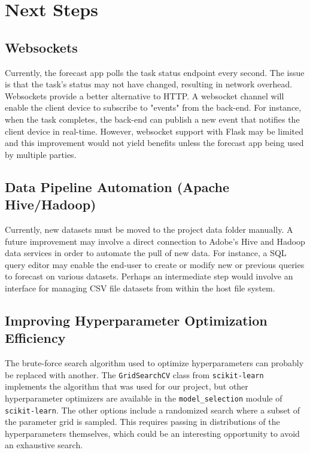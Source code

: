\documentclass[11pt, oneside]{report}
\begin{document}
\section{Next Steps}
\subsection{Websockets}
Currently, the forecast app polls the task status endpoint every second. The issue is that the task's status may not have changed, resulting in network overhead. Websockets provide a better alternative to HTTP. A websocket channel will enable the client device to subscribe to "events" from the back-end. For instance, when the task completes, the back-end can publish a new event that notifies the client device in real-time. However, websocket support with Flask may be limited and this improvement would not yield benefits unless the forecast app being used by multiple parties.

\subsection{Data Pipeline Automation (Apache Hive/Hadoop)}
Currently, new datasets must be moved to the project data folder manually. A future improvement may involve a direct connection to Adobe's Hive and Hadoop data services in order to automate the pull of new data. For instance, a SQL query editor may enable the end-user to create or modify new or previous queries to forecast on various datasets. Perhaps an intermediate step would involve an interface for managing CSV file datasets from within the host file system.

\subsection{Improving Hyperparameter Optimization Efficiency}
\label{improving_hyperparameter_optimization_efficiency}
The brute-force search algorithm used to optimize hyperparameters can probably be replaced with another. The \texttt{GridSearchCV} class from \texttt{scikit-learn} implements the algorithm that was used for our project, but other hyperparameter optimizers are available in the \texttt{model\_selection} module of \texttt{scikit-learn}. The other options include a randomized search where a subset of the parameter grid is sampled. This requires passing in distributions of the hyperparameters themselves, which could be an interesting opportunity to avoid an exhaustive search.
\end{document}
